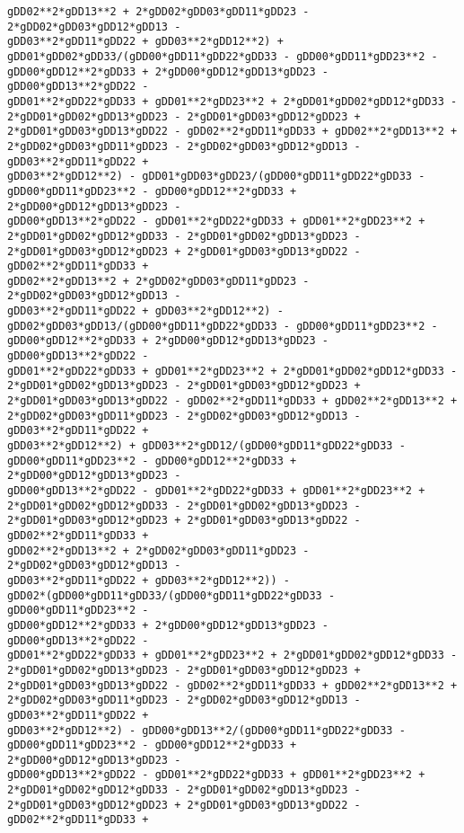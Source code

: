 \documentclass[landscape,letterpaper,10pt,english]{article}
\begin{document}
\begin{Verbatim}[commandchars=\\\{\}]
gDD02**2*gDD13**2 + 2*gDD02*gDD03*gDD11*gDD23 - 2*gDD02*gDD03*gDD12*gDD13 -
gDD03**2*gDD11*gDD22 + gDD03**2*gDD12**2) +
gDD01*gDD02*gDD33/(gDD00*gDD11*gDD22*gDD33 - gDD00*gDD11*gDD23**2 -
gDD00*gDD12**2*gDD33 + 2*gDD00*gDD12*gDD13*gDD23 - gDD00*gDD13**2*gDD22 -
gDD01**2*gDD22*gDD33 + gDD01**2*gDD23**2 + 2*gDD01*gDD02*gDD12*gDD33 -
2*gDD01*gDD02*gDD13*gDD23 - 2*gDD01*gDD03*gDD12*gDD23 +
2*gDD01*gDD03*gDD13*gDD22 - gDD02**2*gDD11*gDD33 + gDD02**2*gDD13**2 +
2*gDD02*gDD03*gDD11*gDD23 - 2*gDD02*gDD03*gDD12*gDD13 - gDD03**2*gDD11*gDD22 +
gDD03**2*gDD12**2) - gDD01*gDD03*gDD23/(gDD00*gDD11*gDD22*gDD33 -
gDD00*gDD11*gDD23**2 - gDD00*gDD12**2*gDD33 + 2*gDD00*gDD12*gDD13*gDD23 -
gDD00*gDD13**2*gDD22 - gDD01**2*gDD22*gDD33 + gDD01**2*gDD23**2 +
2*gDD01*gDD02*gDD12*gDD33 - 2*gDD01*gDD02*gDD13*gDD23 -
2*gDD01*gDD03*gDD12*gDD23 + 2*gDD01*gDD03*gDD13*gDD22 - gDD02**2*gDD11*gDD33 +
gDD02**2*gDD13**2 + 2*gDD02*gDD03*gDD11*gDD23 - 2*gDD02*gDD03*gDD12*gDD13 -
gDD03**2*gDD11*gDD22 + gDD03**2*gDD12**2) -
gDD02*gDD03*gDD13/(gDD00*gDD11*gDD22*gDD33 - gDD00*gDD11*gDD23**2 -
gDD00*gDD12**2*gDD33 + 2*gDD00*gDD12*gDD13*gDD23 - gDD00*gDD13**2*gDD22 -
gDD01**2*gDD22*gDD33 + gDD01**2*gDD23**2 + 2*gDD01*gDD02*gDD12*gDD33 -
2*gDD01*gDD02*gDD13*gDD23 - 2*gDD01*gDD03*gDD12*gDD23 +
2*gDD01*gDD03*gDD13*gDD22 - gDD02**2*gDD11*gDD33 + gDD02**2*gDD13**2 +
2*gDD02*gDD03*gDD11*gDD23 - 2*gDD02*gDD03*gDD12*gDD13 - gDD03**2*gDD11*gDD22 +
gDD03**2*gDD12**2) + gDD03**2*gDD12/(gDD00*gDD11*gDD22*gDD33 -
gDD00*gDD11*gDD23**2 - gDD00*gDD12**2*gDD33 + 2*gDD00*gDD12*gDD13*gDD23 -
gDD00*gDD13**2*gDD22 - gDD01**2*gDD22*gDD33 + gDD01**2*gDD23**2 +
2*gDD01*gDD02*gDD12*gDD33 - 2*gDD01*gDD02*gDD13*gDD23 -
2*gDD01*gDD03*gDD12*gDD23 + 2*gDD01*gDD03*gDD13*gDD22 - gDD02**2*gDD11*gDD33 +
gDD02**2*gDD13**2 + 2*gDD02*gDD03*gDD11*gDD23 - 2*gDD02*gDD03*gDD12*gDD13 -
gDD03**2*gDD11*gDD22 + gDD03**2*gDD12**2)) -
gDD02*(gDD00*gDD11*gDD33/(gDD00*gDD11*gDD22*gDD33 - gDD00*gDD11*gDD23**2 -
gDD00*gDD12**2*gDD33 + 2*gDD00*gDD12*gDD13*gDD23 - gDD00*gDD13**2*gDD22 -
gDD01**2*gDD22*gDD33 + gDD01**2*gDD23**2 + 2*gDD01*gDD02*gDD12*gDD33 -
2*gDD01*gDD02*gDD13*gDD23 - 2*gDD01*gDD03*gDD12*gDD23 +
2*gDD01*gDD03*gDD13*gDD22 - gDD02**2*gDD11*gDD33 + gDD02**2*gDD13**2 +
2*gDD02*gDD03*gDD11*gDD23 - 2*gDD02*gDD03*gDD12*gDD13 - gDD03**2*gDD11*gDD22 +
gDD03**2*gDD12**2) - gDD00*gDD13**2/(gDD00*gDD11*gDD22*gDD33 -
gDD00*gDD11*gDD23**2 - gDD00*gDD12**2*gDD33 + 2*gDD00*gDD12*gDD13*gDD23 -
gDD00*gDD13**2*gDD22 - gDD01**2*gDD22*gDD33 + gDD01**2*gDD23**2 +
2*gDD01*gDD02*gDD12*gDD33 - 2*gDD01*gDD02*gDD13*gDD23 -
2*gDD01*gDD03*gDD12*gDD23 + 2*gDD01*gDD03*gDD13*gDD22 - gDD02**2*gDD11*gDD33 +

\end{Verbatim}
\end{document}
